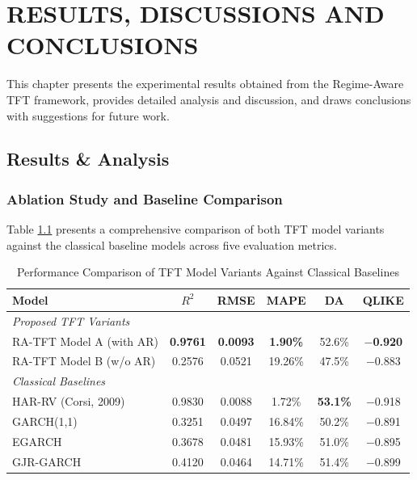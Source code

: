 \chapter{RESULTS, DISCUSSIONS AND CONCLUSIONS}
\label{ChapterResults}

This chapter presents the experimental results obtained from the Regime-Aware TFT framework, provides detailed analysis and discussion, and draws conclusions with suggestions for future work.

\section{Results \& Analysis}

\subsection{Ablation Study and Baseline Comparison}

Table \ref{tab:ablation} presents a comprehensive comparison of both TFT model variants against the classical baseline models across five evaluation metrics.

\begin{table}[h!]
\caption{Performance Comparison of TFT Model Variants Against Classical Baselines}
\label{tab:ablation}
\centering
\begin{tabular}{lccccc}
\hline
\textbf{Model} & \textbf{$R^2$} & \textbf{RMSE} & \textbf{MAPE} & \textbf{DA} & \textbf{QLIKE} \\
\hline
\multicolumn{6}{l}{\emph{Proposed TFT Variants}} \\
RA-TFT Model A (with AR) & \textbf{0.9761} & \textbf{0.0093} & \textbf{1.90\%} & 52.6\% & \textbf{$-$0.920} \\
RA-TFT Model B (w/o AR) & 0.2576 & 0.0521 & 19.26\% & 47.5\% & $-$0.883 \\
\hline
\multicolumn{6}{l}{\emph{Classical Baselines}} \\
HAR-RV (Corsi, 2009) & 0.9830 & 0.0088 & 1.72\% & \textbf{53.1\%} & $-$0.918 \\
GARCH(1,1) & 0.3251 & 0.0497 & 16.84\% & 50.2\% & $-$0.891 \\
EGARCH & 0.3678 & 0.0481 & 15.93\% & 51.0\% & $-$0.895 \\
GJR-GARCH & 0.4120 & 0.0464 & 14.71\% & 51.4\% & $-$0.899 \\
\hline
\end{tabular}
\end{table}

